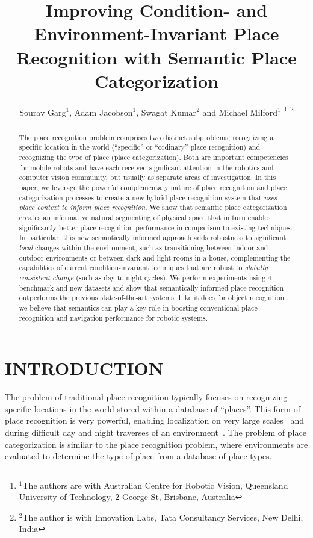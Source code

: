 \documentclass[letterpaper, 10 pt, conference]{ieeeconf}  %
\title{\LARGE \bf
Improving Condition- and Environment-Invariant Place Recognition with Semantic Place Categorization
}
\author{Sourav Garg$^{1}$, Adam Jacobson$^{1}$, Swagat Kumar$^{2}$ and Michael Milford$^{1}$%
\thanks{$^{1}$The authors are with Australian Centre for Robotic Vision,
        Queensland University of Technology,
        2 George St, Brisbane, Australia}%
\thanks{$^{2}$The author is with Innovation Labs, Tata Consultancy Services,
        New Delhi, India}%
}
\begin{document}
\maketitle
\thispagestyle{empty}
\pagestyle{empty}


\begin{abstract}
The place recognition problem comprises two distinct subproblems; recognizing a specific location in the world (``specific'' or ``ordinary'' place recognition) and recognizing the type of place (place categorization). Both are important competencies for mobile robots and have each received significant attention in the robotics and computer vision community, but usually as separate areas of investigation. In this paper, we leverage the powerful complementary nature of place recognition and place categorization processes to create a new hybrid place recognition system that \emph{uses place context to inform place recognition}. We show that semantic place categorization creates an informative natural segmenting of physical space that in turn enables significantly better place recognition performance in comparison to existing techniques. In particular, this new semantically informed approach adds robustness to significant \emph{local} changes within the environment, 
such as transitioning between indoor and outdoor environments or between dark and light rooms in a house, complementing the capabilities of current condition-invariant techniques that are robust to \emph{globally consistent change} (such as day to night cycles). We perform experiments using 4 benchmark and new datasets and show that semantically-informed place recognition outperforms the previous state-of-the-art systems. Like it does for object recognition \cite{sunderhauf2016place}, we believe that  semantics can play a key role in boosting conventional place recognition and navigation performance for robotic systems.
\end{abstract}

\section{INTRODUCTION}

The problem of traditional place recognition typically focuses on recognizing specific locations in the world stored within a database of ``places''. This form of place recognition is very powerful, enabling localization on very large scales~\cite{Cummins2009} and during difficult day and night traverses of an environment~\cite{Milford2012}. The problem of place categorization is similar to the place recognition problem, where environments are evaluated to determine the type of place from a database of place types.
\end{document}
